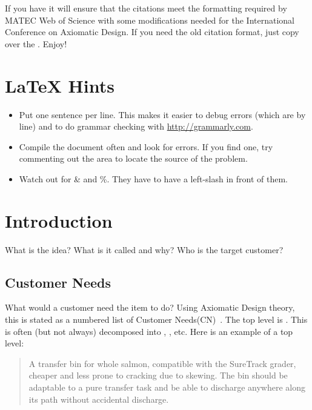 \documentclass[twocolumn]{webofc}
\begin{document}
        If you have  it will ensure that the citations meet the formatting required by MATEC Web of Science with some modifications needed for the International Conference on Axiomatic Design.
        If you need the old citation format, just copy  over the .
        Enjoy!


\listoffixmes{}

\section*{\LaTeX{} Hints}
\begin{itemize}
\item Put one sentence per line.
  This makes it easier to debug errors (which are by line) and to do grammar checking with \url{http://grammarly.com}.
\item Compile the document often and look for errors.
  If you find one, try commenting out the area to locate the source of the problem.
\item Watch out for \& and \%.  They have to have a left-slash in front of them.
\end{itemize}

\section{Introduction}
What is the idea?  What is it called and why?
Who is the target customer?

\subsection{Customer Needs}
What would a customer need the item to do?  
Using Axiomatic Design theory, this is stated as a numbered list of Customer Needs(CN)~\cite{suh1990principles}.
The top level is .
This is often (but not always) decomposed into , , etc.
Here is an example of a top level:

\begin{quote} \textbf{} A transfer bin for whole salmon, compatible with the SureTrack grader, cheaper and less prone to cracking due to skewing.  
The bin should be adaptable to a pure transfer task and be able to discharge anywhere along its path without
accidental discharge.~\cite{gerhard2016suretrack}
\end{quote}
\end{document}

